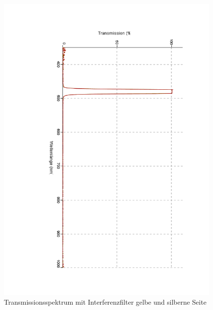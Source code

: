 \documentclass[12pt,a4paper]{article}
\begin{document}
\begin{figure}[H]
	\centering
	\includegraphics[scale=0.5,angle = 90,trim = 20mm 20mm 20mm 20mm]{./data/Spektro/Interferenzfilter_Transmission_Gelb_Silber.pdf}
	\caption{Transmissionsspektrum mit Interferenzfilter gelbe und silberne Seite}
	\label{fig:InterferenzSilber}
\end{figure}
\end{document}
